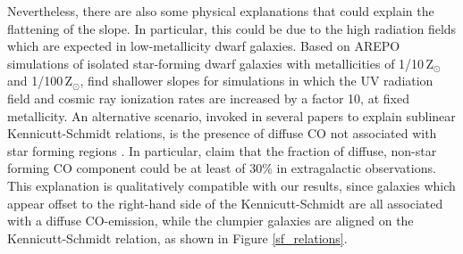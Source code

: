 \documentclass{aa}
\newcommand{\hi}{H~{\sc i}}
\newcommand{\alphaCO}{\ifmmode \alpha_{\rm CO} \else $\alpha_{\rm CO}$\fi}
\begin{document}
Nevertheless, there are also some physical explanations that could explain the flattening of the slope. In particular, this could be due to the high radiation fields which are expected in low-metallicity dwarf galaxies. Based on AREPO simulations \citep{Weinberger_arepo_2020} of isolated star-forming dwarf galaxies with metallicities of 1/10\,Z$_{\odot}$ and 1/100\,Z$_{\odot}$, \cite{Whitworth_KS_2022} find shallower slopes for simulations in which the UV radiation field and cosmic ray ionization rates are increased by a factor 10, at fixed metallicity. 
An alternative scenario, invoked in several papers to explain sublinear Kennicutt-Schmidt relations, is the presence of diffuse CO not associated with star forming regions \citep[e.g.,][]{SKB_2013, Shetty_2014}. In particular, \cite{Shetty_2014} claim that the fraction of diffuse, non-star forming CO component could be at least of 30\% in extragalactic observations. This explanation is qualitatively compatible with our results, since galaxies which appear offset to the right-hand side of the Kennicutt-Schmidt are all associated with a diffuse CO-emission, while the clumpier galaxies are aligned on the Kennicutt-Schmidt relation, as shown in Figure \ref{sf_relations}. 




   
\end{document}
